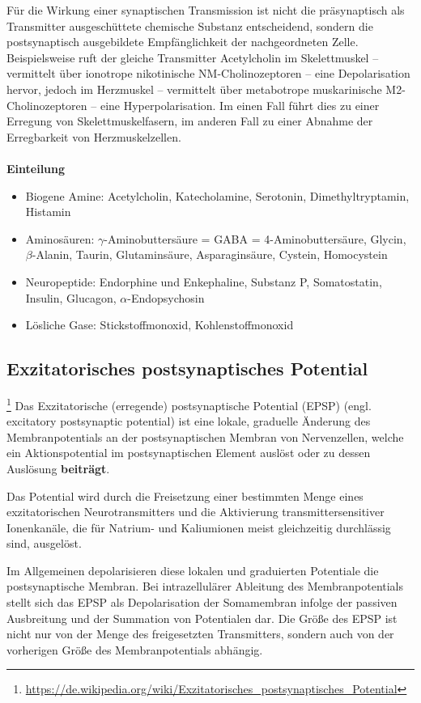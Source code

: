 Für die Wirkung einer synaptischen Transmission ist nicht die präsynaptisch als Transmitter ausgeschüttete chemische Substanz entscheidend, sondern die postsynaptisch ausgebildete Empfänglichkeit der nachgeordneten Zelle. Beispielsweise ruft der gleiche Transmitter Acetylcholin im Skelettmuskel – vermittelt über ionotrope nikotinische NM-Cholinozeptoren – eine Depolarisation hervor, jedoch im Herzmuskel – vermittelt über metabotrope muskarinische M2-Cholinozeptoren – eine Hyperpolarisation. Im einen Fall führt dies zu einer Erregung von Skelettmuskelfasern, im anderen Fall zu einer Abnahme der Erregbarkeit von Herzmuskelzellen.
\\\\
\textbf{Einteilung}\\
\begin{itemize}
	\item Biogene Amine: Acetylcholin, Katecholamine, Serotonin, Dimethyltryptamin, Histamin
	\item Aminosäuren: $\gamma$-Aminobuttersäure = GABA = 4-Aminobuttersäure, Glycin, $\beta$-Alanin, Taurin, Glutaminsäure, Asparaginsäure, Cystein, Homocystein
	\item Neuropeptide: Endorphine und Enkephaline, Substanz P, Somatostatin, Insulin, Glucagon, $\alpha$-Endopsychosin
	\item Lösliche Gase: Stickstoffmonoxid, Kohlenstoffmonoxid
\end{itemize}

\subsection{Exzitatorisches postsynaptisches Potential}\footnote{\url{https://de.wikipedia.org/wiki/Exzitatorisches_postsynaptisches_Potential}} Das Exzitatorische (erregende) postsynaptische Potential (EPSP) (engl. excitatory postsynaptic potential) ist eine lokale, graduelle Änderung des Membranpotentials an der postsynaptischen Membran von Nervenzellen, welche ein Aktionspotential im postsynaptischen Element auslöst oder zu dessen Auslösung \textbf{beiträgt}.

Das Potential wird durch die Freisetzung einer bestimmten Menge eines exzitatorischen Neurotransmitters und die Aktivierung transmittersensitiver Ionenkanäle, die für Natrium- und Kaliumionen meist gleichzeitig durchlässig sind, ausgelöst.

Im Allgemeinen depolarisieren diese lokalen und graduierten Potentiale die postsynaptische Membran. Bei intrazellulärer Ableitung des Membranpotentials stellt sich das EPSP als Depolarisation der Somamembran infolge der passiven Ausbreitung und der Summation von Potentialen dar. Die Größe des EPSP ist nicht nur von der Menge des freigesetzten Transmitters, sondern auch von der vorherigen Größe des Membranpotentials abhängig.

